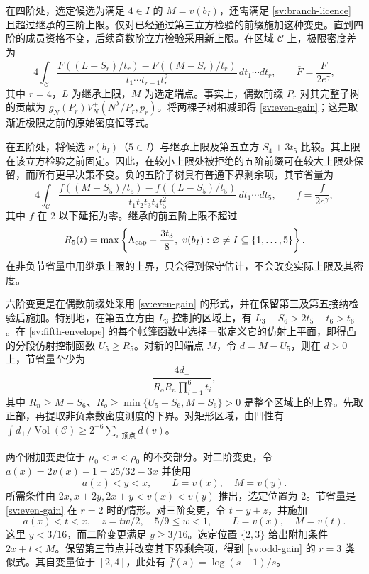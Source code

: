 在四阶处，选定候选为满足 $4\in I$ 的 $M=v(b_I)$，还需满足 \eqref{sv:branch-licence} 且超过继承的三阶上限。仅对已经通过第三立方检验的前缀施加这种变更。直到四阶的成员资格不变，后续奇数阶立方检验采用新上限。在区域 $\mathcal C$ 上，极限密度差为
\begin{equation}\label{sv:even-gain}
 4\int_{\mathcal C}
 \frac{\overline F((L-S_r)/t_r)
                   -\overline F((M-S_r)/t_r)}
      {t_1\cdots t_{r-1}t_r^2}\,dt_1\cdots dt_r,
 \qquad \overline F=\frac{F}{2e^\gamma},
\end{equation}
其中 $r=4$，$L$ 为继承上限，$M$ 为选定端点。事实上，偶数前缀 $P_r$ 对其完整子树的贡献为 $g_N(P_r)V_N^+(N^\lambda/P_r,p_r)$。将两棵子树相减即得 \eqref{sv:even-gain}；这是取渐近极限之前的原始密度恒等式。

在五阶处，将候选 $v(b_I)$（$5\in I$）与继承上限及第五立方 $S_4+3t_5$ 比较。其上限在该立方检验之前固定。因此，在较小上限处被拒绝的五阶前缀可在较大上限处保留，而所有更早决策不变。负的五阶子树具有普通下界剩余项，其节省量为
\begin{equation}\label{sv:odd-gain}
 4\int_{\mathcal C}
 \frac{\overline f((M-S_5)/t_5)
                   -\overline f((L-S_5)/t_5)}
      {t_1t_2t_3t_4t_5^2}\,dt_1\cdots dt_5,
 \qquad \overline f=\frac{f}{2e^\gamma},
\end{equation}
其中 $\overline f$ 在 $2$ 以下延拓为零。继承的前五阶上限不超过
\begin{equation}\label{sv:fifth-envelope}
 R_5(t)=\max\left\{\Lambda_{\rm cap}-\frac{3t_3}{8},\
         v(b_I):\varnothing\ne I\subseteq\{1,\ldots,5\}\right\}.
\end{equation}
在非负节省量中用继承上限的上界，只会得到保守估计，不会改变实际上限及其密度。

六阶变更是在偶数前缀处采用 \eqref{sv:even-gain} 的形式，并在保留第三及第五接纳检验后施加。特别地，在第五立方由 $L_3$ 控制的区域上，有 $L_3-S_6>2t_5-t_6>t_6$。在 \eqref{sv:fifth-envelope} 的每个帐篷函数中选择一张定义它的仿射上平面，即得凸的分段仿射控制函数 $U_5\ge R_5$。对新的凹端点 $M$，令 $d=M-U_5$，则在 $d>0$ 上，节省量至少为
\begin{equation}\label{sv:sixth-lower}
 \frac{4d_+}{R_oR_n\prod_{i=1}^6t_i},
\end{equation}
其中 $R_n\ge M-S_6$、$R_o\ge\min\{U_5-S_6,M-S_6\}>0$ 是整个区域上的上界。先取正部，再提取非负素数密度测度的下界。对矩形区域，由凹性有 $\int d_+/\operatorname{Vol}(\mathcal C)
\ge 2^{-6}\sum_{v\text{ 顶点}}d(v)$。

两个附加变更位于 $\mu_0<x<\rho_0$ 的不交部分。对二阶变更，令 $a(x)=2v(x)-1=25/32-3x$ 并使用
\[
 a(x)<y<x,\qquad L=v(x),\quad M=v(y).
\]
所需条件由 $2x,x+2y,2x+y< v(x)<v(y)$ 推出，选定位置为 $2$。节省量是 \eqref{sv:even-gain} 在 $r=2$ 时的情形。对三阶变更，令 $t=y+z$，并施加
\[
 a(x)<t<x,\quad z=tw/2,\quad 5/9\le w<1,
 \qquad L=v(x),\quad M=v(t).
\]
这里 $y<3/16$，而二阶变更满足 $y\ge3/16$。选定位置 $\{2,3\}$ 给出附加条件 $2x+t<M$。保留第三节点并改变其下界剩余项，得到 \eqref{sv:odd-gain} 的 $r=3$ 类似式。其自变量位于 $[2,4]$，此处有 $\overline f(s)=\log(s-1)/s$。

